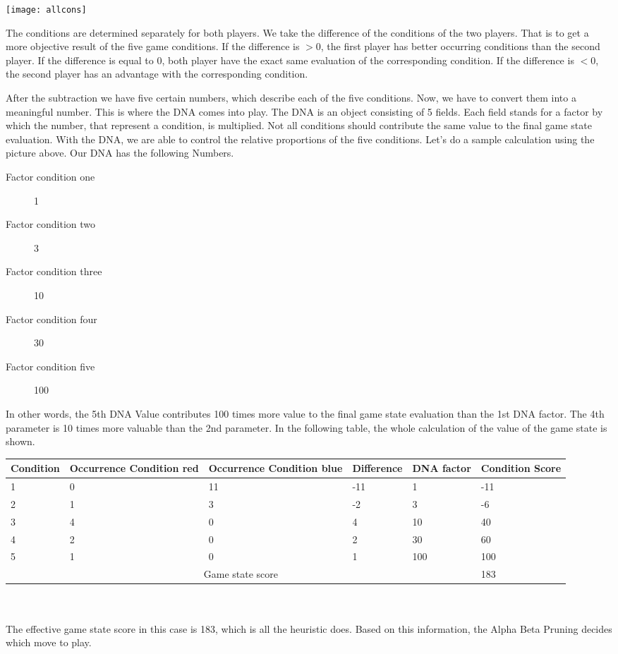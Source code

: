 \begin{fixedpic}
	\centering
	\texttt{[image: allcons]}
\end{fixedpic}
The conditions are determined separately for both players. We take the difference of the conditions of the two players. That is to get a more objective result of the five game conditions. If the difference is $>0$, the first player has better occurring conditions than the second player. If the difference is equal to $0$, both player have the exact same evaluation of the corresponding condition.
If the difference is $<0$, the second player has an advantage with the corresponding condition.


After the subtraction we have five certain numbers, which describe each of the five conditions.  Now, we have to convert them into a meaningful number. This is where the DNA comes into play. The DNA is an object consisting of 5 fields. Each field stands for a factor by which the number, that represent a  condition, is multiplied. Not all conditions should contribute the same value to the final game state evaluation. With the DNA, we are able to control the relative proportions of the five conditions. Let's do a sample calculation using the picture above. Our DNA has the following Numbers.
\begin{center}
\begin{description}
\item[Factor condition one] 1
\item[Factor condition two] 3
\item[Factor condition three] 10
\item[Factor condition four] 30
\item[Factor condition five] 100
\end{description}
\end{center}


In other words, the 5th DNA Value contributes 100 times more value to the final game state evaluation than the 1st DNA factor. The 4th parameter is 10 times more valuable than the 2nd parameter. In the following table, the whole calculation of the value of the game state is shown.

\begin{tabularx}{\textwidth}{|X|X|X|X|X|X|}
\hline
Condition & Occurrence Condition red & Occurrence Condition blue & Difference & DNA factor & Condition Score \\\hline
1	& 0	& 11	& -11	& 1 	& -11 \\\hline
2	& 1	& 3 	& -2	& 3 	& -6 \\\hline
3	& 4	& 0 	& 4 	& 10	& 40 \\\hline
4	& 2	& 0 	& 2 	& 30	& 60 \\\hline
5	& 1	& 0 	& 1 	& 100	& 100 \\\hline
\multicolumn{5}{|c|}{Game state score}&183 \\\hline
\end{tabularx}\\
\\
The effective game state score in this case is 183, which is all the heuristic does.
Based on this information, the Alpha Beta Pruning decides which move to play.



